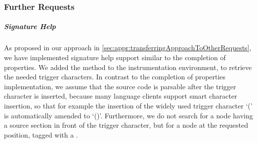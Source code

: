 

\subsubsection{Further Requests}
    
    \subparagraph{Signature Help}
    As proposed in our approach in \autoref{sec:appr:transferringApproachToOtherRequests}, we have implemented signature help support similar to the completion of properties. We added the method  to the instrumentation environment, to retrieve the needed trigger characters. In contrast to the completion of properties implementation, we assume that the source code is parsable after the trigger character is inserted, because many language clients support smart character insertion, so that for example the insertion of the widely used trigger character `(' is automatically amended to `()'. Furthermore, we do not search for a node having a source section in front of the trigger character, but for a node at the requested position, tagged with a .
    
